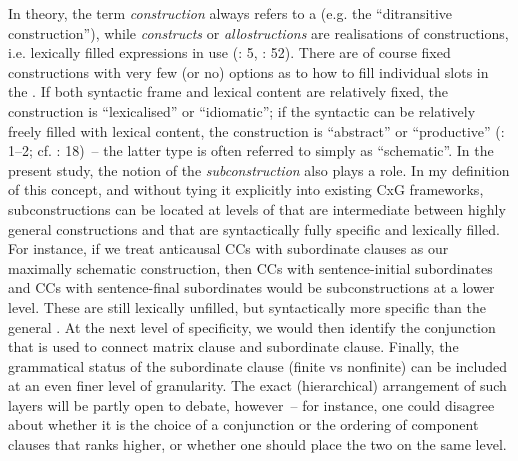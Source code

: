   In theory, the term \textit{construction} always refers to a  (e.g. the “ditransitive construction”), while \textit{constructs} or \textit{allostructions} are realisations of constructions, i.e. lexically filled expressions in use (\citealt{BergsDiewald2008}: 5, \citealt{Cappelle2006,Fried2008}: 52). There are of course fixed constructions with very few (or no) options as to how to fill individual slots in the . If both syntactic frame and lexical content are relatively fixed, the construction is “lexicalised” or “idiomatic”; if the syntactic  can be relatively freely filled with lexical content, the construction is “abstract” or “productive” (\citealt{BergsDiewald2008}: 1–2; cf. \citealt{Goldberg2013}: 18)~– the latter type is often referred to simply as “schematic”. In the present study, the notion of the \textit{subconstruction} also plays a role. In my definition of this concept, and without tying it explicitly into existing CxG frameworks, subconstructions can be located at levels of  that are intermediate between highly general constructions and  that are syntactically fully specific and lexically filled. For instance, if we treat anticausal CCs with subordinate clauses as our maximally schematic construction, then CCs with sentence-initial subordinates and CCs with sentence-final subordinates would be subconstructions at a lower level. These are still lexically unfilled, but syntactically more specific than the general . At the next level of specificity, we would then identify the conjunction that is used to connect matrix clause and subordinate clause. Finally, the grammatical status of the subordinate clause (finite vs nonfinite) can be included at an even finer level of granularity. The exact (hierarchical) arrangement of such layers will be partly open to debate, however~– for instance, one could disagree about whether it is the choice of a conjunction or the ordering of component clauses that ranks higher, or whether one should place the two on the same level.


